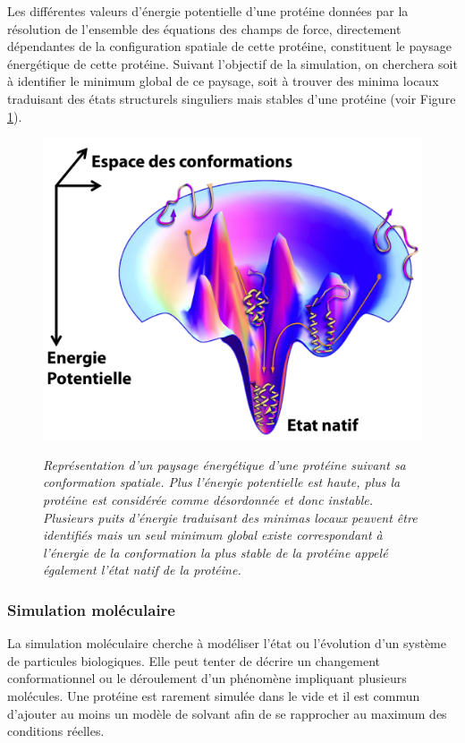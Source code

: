 Les différentes valeurs d'énergie potentielle d'une protéine données par la résolution de l'ensemble des équations des champs de force, directement dépendantes de la configuration spatiale de cette protéine, constituent le paysage énergétique de cette protéine. Suivant l’objectif de la simulation, on cherchera soit à identifier le minimum global de ce paysage, soit à trouver des minima locaux traduisant des états structurels singuliers mais stables d'une protéine (voir Figure \ref{Fig:energy_landscape_edit}).


\begin{figure}
  \centering
  {\includegraphics[width=0.75\linewidth]{./figures/ch1/energy_landscape_edit.png}}
    \caption{\it Représentation d'un paysage énergétique d'une protéine suivant sa conformation spatiale. Plus l'énergie potentielle est haute, plus la protéine est considérée comme désordonnée et donc instable. Plusieurs puits d'énergie traduisant des minimas locaux peuvent être identifiés mais un seul minimum global existe correspondant à l'énergie de la conformation la plus stable de la protéine appelé également l'état natif de la protéine.}
    \label{Fig:energy_landscape_edit}
  \hspace{0.2cm}
\end{figure}
 

\subsubsection{Simulation moléculaire} \label{simu}


La simulation moléculaire cherche à modéliser l'état ou l'évolution d'un système de particules biologiques. Elle peut tenter de décrire un changement conformationnel ou le déroulement d'un phénomène impliquant plusieurs molécules.
Une protéine est rarement simulée dans le vide et il est commun d'ajouter au moins un modèle de solvant afin de se rapprocher au maximum des conditions réelles.

